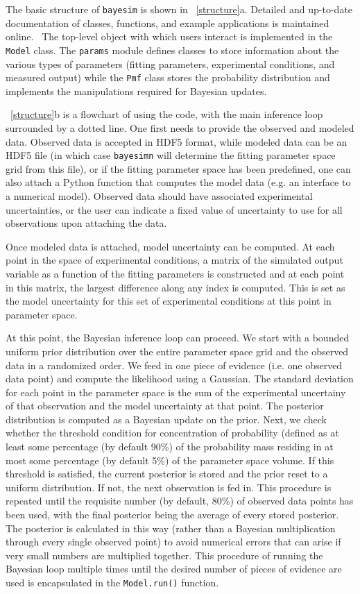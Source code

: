\documentclass[aps,prl,amsmath,amssymb,superscriptaddress,notitlepage,groupedaddress]{revtex4-1}
\begin{document}
  The basic structure of \texttt{bayesim} is shown in ~\autoref{structure}a. Detailed and up-to-date documentation of classes, functions, and example applications is maintained online.~\cite{docs} The top-level object with which users interact is implemented in the \texttt{Model} class. The \texttt{params} module defines classes to store information about the various types of parameters (fitting parameters, experimental conditions, and measured output) while the \texttt{Pmf} class stores the probability distribution and implements the manipulations required for Bayesian updates.

  ~\autoref{structure}b is a flowchart of using the code, with the main inference loop surrounded by a dotted line. One first needs to provide the observed and modeled data. Observed data is accepted in HDF5 format, while modeled data can be an HDF5 file (in which case \texttt{bayesimn} will determine the fitting parameter space grid from this file), or if the fitting parameter space has been predefined, one can also attach a Python function that computes the model data (e.g. an interface to a numerical model). Observed data should have associated experimental uncertainties, or the user can indicate a fixed value of uncertainty to use for all observations upon attaching the data.

  Once modeled data is attached, model uncertainty can be computed. At each point in the space of experimental conditions, a matrix of the simulated output variable as a function of the fitting parameters is constructed and at each point in this matrix, the largest difference along any index is computed. This is set as the model uncertainty for this set of experimental conditions at this point in parameter space.

  At this point, the Bayesian inference loop can proceed. We start with a bounded uniform prior distribution over the entire parameter space grid and the observed data in a randomized order. We feed in one piece of evidence (i.e. one observed data point) and compute the likelihood using a Gaussian. The standard deviation for each point in the parameter space is the sum of the experimental uncertainy of that observation and the model uncertainty at that point. The posterior distribution is computed as a Bayesian update on the prior. Next, we check whether the threshold condition for concentration of probability (defined as at least some percentage (by default 90\%) of the probability mass residing in at most some percentage (by default 5\%) of the parameter space volume. If this threshold is satisfied, the current posterior is stored and the prior reset to a uniform distribution. If not, the next observation is fed in. This procedure is repeated until the requisite number (by default, 80\%) of observed data points has been used, with the final posterior being the average of every stored posterior. The posterior is calculated in this way (rather than a Bayesian multiplication through every single observed point) to avoid numerical errors that can arise if very small numbers are multiplied together. This procedure of running the Bayesian loop multiple times until the desired number of pieces of evidence are used is encapsulated in the \texttt{Model.run()} function.
\end{document}
